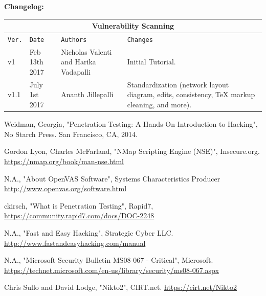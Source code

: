 \documentclass[12pt]{extarticle}
\begin{document}
\pagebreak
{}
\textbf{Changelog:}
\label{changelog}
\vspace{6mm}


\begin{tabular}{ |p{1cm}|p{3cm}|p{3cm}|p{5cm}|  }
\hline
\multicolumn{4}{|c|}{Vulnerability Scanning} \\
\hline
\texttt{Ver.} & \texttt{Date} & \texttt{Authors} & \texttt{Changes} \\
\hline
v1 & Feb 13th 2017 & Nicholas Valenti and Harika Vadapalli & Initial Tutorial. \\
\hline
v1.1 & July 1st 2017 & Ananth Jillepalli & Standardization (network layout diagram, edits, consistency, TeX markup cleaning, and more). \\ \hline
\end{tabular}

\pagebreak


\begin{thebibliography}{9}

Weidman, Georgia, "Penetration Testing: A Hands-On Introduction to Hacking", No Starch Press. San Francisco, CA, 2014.

Gordon Lyon, Charles McFarland, "NMap Scripting Engine (NSE)", Insecure.org.
\url{https://nmap.org/book/man-nse.html}

N.A., "About OpenVAS Software", Systems Characteristics Producer
\url{http://www.openvas.org/software.html}

ckirsch, "What is Penetration Testing", Rapid7,
\url{https://community.rapid7.com/docs/DOC-2248}

N.A., "Fast and Easy Hacking", Strategic Cyber LLC.
\url{http://www.fastandeasyhacking.com/manual}

N.A., "Microsoft Security Bulletin MS08-067 - Critical", Microsoft.
\url{https://technet.microsoft.com/en-us/library/security/ms08-067.aspx}

Chris Sullo and David Lodge, "Nikto2", CIRT.net.
\url{https://cirt.net/Nikto2}

\end{thebibliography}
\end{document}
